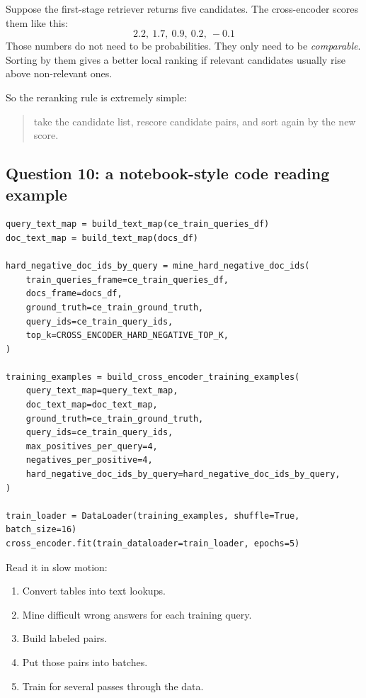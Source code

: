 \documentclass[10pt]{article}
\begin{document}
Suppose the first-stage retriever returns five candidates. The cross-encoder scores them like this:
\[
2.2,\ 1.7,\ 0.9,\ 0.2,\ -0.1
\]
Those numbers do not need to be probabilities. They only need to be \emph{comparable}. Sorting by them gives a better local ranking if relevant candidates usually rise above non-relevant ones.

So the reranking rule is extremely simple:
\begin{quote}
take the candidate list, rescore candidate pairs, and sort again by the new score.
\end{quote}

\subsection*{Question 10: a notebook-style code reading example}

\begin{lstlisting}[caption={Study version of the cross-encoder training block}]
query_text_map = build_text_map(ce_train_queries_df)
doc_text_map = build_text_map(docs_df)

hard_negative_doc_ids_by_query = mine_hard_negative_doc_ids(
    train_queries_frame=ce_train_queries_df,
    docs_frame=docs_df,
    ground_truth=ce_train_ground_truth,
    query_ids=ce_train_query_ids,
    top_k=CROSS_ENCODER_HARD_NEGATIVE_TOP_K,
)

training_examples = build_cross_encoder_training_examples(
    query_text_map=query_text_map,
    doc_text_map=doc_text_map,
    ground_truth=ce_train_ground_truth,
    query_ids=ce_train_query_ids,
    max_positives_per_query=4,
    negatives_per_positive=4,
    hard_negative_doc_ids_by_query=hard_negative_doc_ids_by_query,
)

train_loader = DataLoader(training_examples, shuffle=True, batch_size=16)
cross_encoder.fit(train_dataloader=train_loader, epochs=5)
\end{lstlisting}

Read it in slow motion:
\begin{enumerate}
    \item Convert tables into text lookups.
    \item Mine difficult wrong answers for each training query.
    \item Build labeled pairs.
    \item Put those pairs into batches.
    \item Train for several passes through the data.
\end{enumerate}
\end{document}
